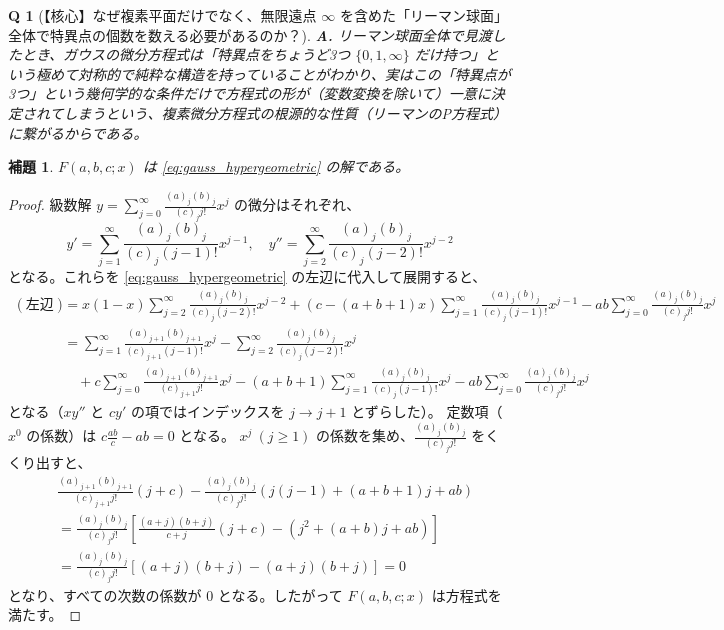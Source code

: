 \documentclass[paper=a4, fontsize=11pt]{jlreq} %
\theoremstyle{break}
\newtheorem{lemma}[theorem]{補題}
\theoremstyle{qa}
\newtheorem*{Q}{Q}
\theoremstyle{remark} %
\begin{document}
\begin{Q}[【核心】なぜ複素平面だけでなく、無限遠点 $\infty$ を含めた「リーマン球面」全体で特異点の個数を数える必要があるのか？]
\textbf{A.} リーマン球面全体で見渡したとき、ガウスの微分方程式は「特異点をちょうど3つ $\{0, 1, \infty\}$ だけ持つ」という極めて対称的で純粋な構造を持っていることがわかり、実はこの「特異点が3つ」という幾何学的な条件だけで方程式の形が（変数変換を除いて）一意に決定されてしまうという、複素微分方程式の根源的な性質（リーマンのP方程式）に繋がるからである。
\end{Q}
\begin{lemma}\label{lem:hypergeometric_solution}
    $F(a,b,c;x)$ は \eqref{eq:gauss_hypergeometric} の解である。
\end{lemma}

\begin{proof}
    級数解 $y = \sum_{j=0}^{\infty}\frac{(a)_{j}(b)_{j}}{(c)_{j}j!}x^{j}$ の微分はそれぞれ、
    \[
    y' = \sum_{j=1}^{\infty}\frac{(a)_{j}(b)_{j}}{(c)_{j}(j-1)!}x^{j-1}, \quad
    y'' = \sum_{j=2}^{\infty}\frac{(a)_{j}(b)_{j}}{(c)_{j}(j-2)!}x^{j-2}
    \]
    となる。これらを \eqref{eq:gauss_hypergeometric} の左辺に代入して展開すると、
    \begin{align*}
    (\text{左辺}) &= x(1-x)\sum_{j=2}^{\infty}\frac{(a)_{j}(b)_{j}}{(c)_{j}(j-2)!}x^{j-2} + (c-(a+b+1)x)\sum_{j=1}^{\infty}\frac{(a)_{j}(b)_{j}}{(c)_{j}(j-1)!}x^{j-1} - ab\sum_{j=0}^{\infty}\frac{(a)_{j}(b)_{j}}{(c)_{j}j!}x^{j} \\
    &= \sum_{j=1}^{\infty}\frac{(a)_{j+1}(b)_{j+1}}{(c)_{j+1}(j-1)!}x^{j} - \sum_{j=2}^{\infty}\frac{(a)_{j}(b)_{j}}{(c)_{j}(j-2)!}x^{j} \\
    &\quad + c\sum_{j=0}^{\infty}\frac{(a)_{j+1}(b)_{j+1}}{(c)_{j+1}j!}x^{j} - (a+b+1)\sum_{j=1}^{\infty}\frac{(a)_{j}(b)_{j}}{(c)_{j}(j-1)!}x^{j} - ab\sum_{j=0}^{\infty}\frac{(a)_{j}(b)_{j}}{(c)_{j}j!}x^{j}
    \end{align*}
    となる（$x y''$ と $c y'$ の項ではインデックスを $j \to j+1$ とずらした）。
    定数項（$x^0$ の係数）は $c\frac{ab}{c} - ab = 0$ となる。
    $x^j \ (j \ge 1)$ の係数を集め、$\frac{(a)_{j}(b)_{j}}{(c)_{j}j!}$ をくくり出すと、
    \begin{align*}
    & \frac{(a)_{j+1}(b)_{j+1}}{(c)_{j+1}j!} (j + c) - \frac{(a)_{j}(b)_{j}}{(c)_{j}j!} \left( j(j-1) + (a+b+1)j + ab \right) \\
    &= \frac{(a)_{j}(b)_{j}}{(c)_{j}j!} \left[ \frac{(a+j)(b+j)}{c+j}(j+c) - (j^2 + (a+b)j + ab) \right] \\
    &= \frac{(a)_{j}(b)_{j}}{(c)_{j}j!} \left[ (a+j)(b+j) - (a+j)(b+j) \right] = 0
    \end{align*}
    となり、すべての次数の係数が $0$ となる。したがって $F(a,b,c;x)$ は方程式を満たす。
\end{proof}
\end{document}
